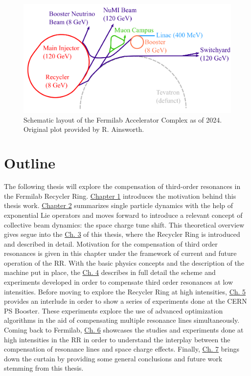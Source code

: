 \begin{figure}[H]
    \centering
    \includegraphics[width=\columnwidth]{chapter1/complex.png}
    \caption{Schematic layout of the Fermilab Accelerator Complex as of 2024. Original plot provided by R. Ainsworth.}
    \label{fig:fac}
 \end{figure}

\section{Outline}

The following thesis will explore the compensation of third-order resonances in the Fermilab Recycler Ring. \hyperref[sec:ch1]{Chapter 1} introduces the motivation behind this thesis work. \hyperref[sec:ch2]{Chapter 2} summarizes single particle dynamics with the help of exponential Lie operators and moves forward to introduce a relevant concept of collective beam dynamics: the space charge tune shift. This theoretical overview gives segue into the \hyperref[sec:ch3]{Ch. 3} of this thesis, where the Recycler Ring is introduced and described in detail. Motivation for the compensation of third order resonances is given in this chapter under the framework of current and future operation of the RR. With the basic physics concepts and the description of the machine put in place, the \hyperref[sec:ch4]{Ch. 4} describes in full detail the scheme and experiments developed in order to compensate third order resonances at low intensities. Before moving to explore the Recycler Ring at high intensities, \hyperref[sec:ch5]{Ch. 5} provides an interlude in order to show a series of experiments done at the CERN PS Booster. These experiments explore the use of advanced optimization algorithms in the aid of compensating multiple resonance lines simultaneously. Coming back to Fermilab, \hyperref[sec:ch6]{Ch. 6} showcases the studies and experiments done at high intensities in the RR in order to understand the interplay between the compensation of resonance lines and space charge effects. Finally, \hyperref[sec:ch7]{Ch. 7} brings down the curtain by providing some general conclusions and future work stemming from this thesis.